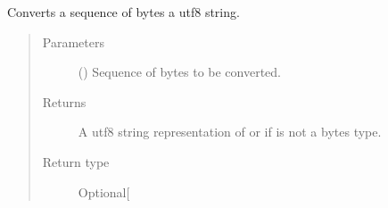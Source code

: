 \documentclass[letterpaper,10pt,english]{sphinxmanual}
\begin{document}
\begin{fulllineitems}
\label{\detokenize{app.utils:app.utils.convertions.bytes_to_utf8string}}
Converts a sequence of bytes a utf\sphinxhyphen{}8 string.
\begin{quote}\begin{description}
\item[{Parameters}] \leavevmode
{} () \textendash{} Sequence of bytes to be converted.

\item[{Returns}] \leavevmode
A utf\sphinxhyphen{}8 string representation of  or  if 
is not a bytes type.

\item[{Return type}] \leavevmode
Optional{[}\sphinxhref{https://docs.python.org/3.7/library/stdtypes.html\#str}{str}{]}

\end{description}\end{quote}

\end{fulllineitems}

\end{document}
